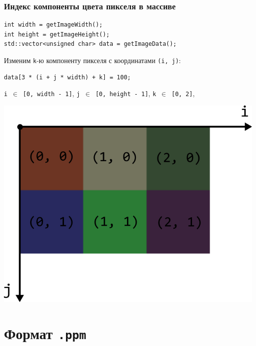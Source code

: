 \documentclass[10pt,pdf,hyperref={unicode}]{beamer}
\begin{document}
\begin{frame}[fragile]
\frametitle{Индекс компоненты цвета пикселя в массиве} 
\begin{lstlisting}
int width = getImageWidth();
int height = getImageHeight();
std::vector<unsigned char> data = getImageData();
\end{lstlisting}

Изменим \texttt{k}-ю компоненту пикселя с координатами \texttt{(i, j)}:
\begin{lstlisting}
data[3 * (i + j * width) + k] = 100;
\end{lstlisting}
\texttt{i $\in$ [0, width - 1]}, \texttt{j $\in$ [0, height - 1]}, \texttt{k $\in$ [0, 2]},

\begin{center}
\includegraphics[scale=0.5]{./images/image_coords.png}
\end{center}
\end{frame}


\section{Формат \texttt{.ppm}}
\end{document}
